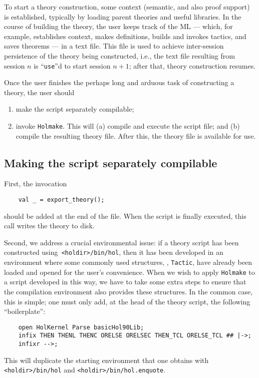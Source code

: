 \documentclass[12pt,fleqn,layout,a4paper]{report}
\begin{document}
To start a theory construction, some context (semantic, and also proof
support) is established, typically by loading parent theories and useful
libraries. In the course of building the theory, the user keeps track of
the ML --- which, for example, establishes context, makes definitions,
builds and invokes tactics, and saves theorems --- in a text file. This
file is used to achieve inter-session persistence of the theory being
constructed, i.e., the text file resulting from session $n$ is
``\verb+use+''d to start session $n+1$; after that, theory construction
resumes.

Once the user finishes the perhaps long and arduous task of constructing
a theory, the user should
\begin{enumerate}
\item make the script separately compilable;
\item invoke {\tt Holmake}. This will (a) compile and execute the script
       file; and (b) compile the resulting theory file. After this, the
       theory file is available for use.
\end{enumerate}

\subsection{Making the script separately compilable}

First, the invocation
\begin{verbatim}
    val _ = export_theory();
\end{verbatim}
should be added at the end of the file. When the script is finally
executed, this call writes the theory to disk.

Second, we address a crucial environmental issue: if a theory script has
been constructed using\verb+ <holdir>/bin/hol+, then it has been developed in
an environment where some commonly used structures, \eg, \verb+Tactic+, have
already been loaded and opened for the user's convenience. When we wish
to apply {\tt Holmake} to a script developed in this way, we have to take some
extra steps to ensure that the compilation environment also provides
these structures.  In the common case, this is simple; one must only
add, at the head of the theory script, the following ``boilerplate'':
\begin{verbatim}
    open HolKernel Parse basicHol90Lib;
    infix THEN THENL THENC ORELSE ORELSEC THEN_TCL ORELSE_TCL ## |->;
    infixr -->;
\end{verbatim}
This will duplicate the starting environment that one obtains with
\verb+<holdir>/bin/hol+ and \verb+<holdir>/bin/hol.enquote+.
\end{document}

